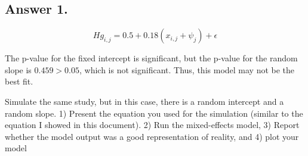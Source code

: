 \documentclass[
  letterpaper,
  DIV=11,
  numbers=noendperiod]{scrartcl}
\begin{document}
\subsection{Answer 1.}\label{answer-1.}

\[
Hg_{i,j} = 0.5+0.18(x_{i,j}+\psi_j) + \epsilon
\]

The p-value for the fixed intercept is significant, but the p-value for
the random slope is \(0.459>0.05\), which is not significant. Thus, this
model may not be the best fit.

\begin{tcolorbox}[enhanced jigsaw, title=\textcolor{quarto-callout-important-color}{\faExclamation}\hspace{0.5em}{Question 2. Points: 10}, rightrule=.15mm, breakable, colbacktitle=quarto-callout-important-color!10!white, leftrule=.75mm, colback=white, bottomrule=.15mm, toprule=.15mm, opacitybacktitle=0.6, colframe=quarto-callout-important-color-frame, left=2mm, coltitle=black, opacityback=0, bottomtitle=1mm, toptitle=1mm, titlerule=0mm, arc=.35mm]

Simulate the same study, but in this case, there is a random intercept
and a random slope. 1) Present the equation you used for the simulation
(similar to the equation I showed in this document). 2) Run the
mixed-effects model, 3) Report whether the model output was a good
representation of reality, and 4) plot your model

\end{tcolorbox}
\end{document}
